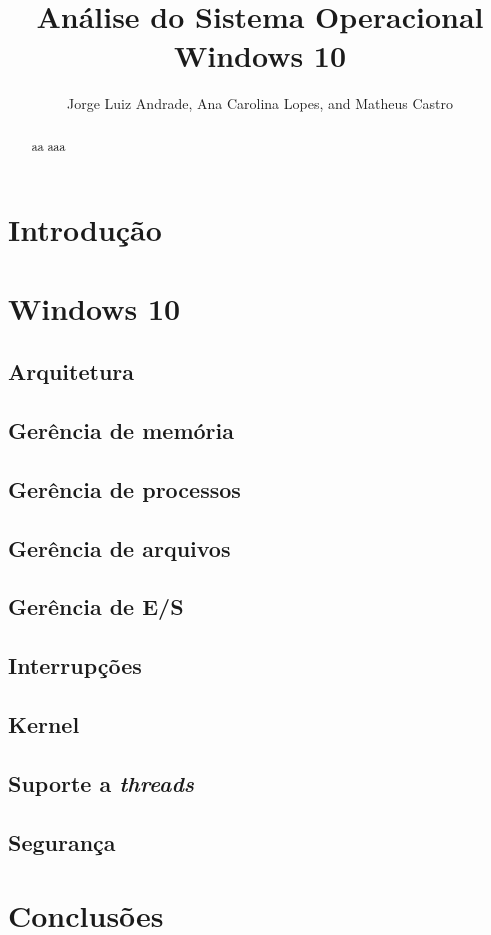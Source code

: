 \documentclass[journal]{IEEEtran}
\title{Análise do Sistema Operacional Windows 10}
\author{Jorge Luiz Andrade,
	Ana Carolina Lopes,
	and Matheus Castro}%
\begin{document}
 
	
	\maketitle
	
	\begin{abstract} 
		aa aaa\cite{internals_pt1}
	\end{abstract}
	
	\section{Introdução}
	
	
	\section{Windows 10}
	
	\subsection{Arquitetura}
	
	
	\subsection{Gerência de memória}
	
	
	\subsection{Gerência de processos}
	
	
	\subsection{Gerência de arquivos}
	 
	
	\subsection{Gerência de E/S}
	
	
	\subsection{Interrupções}
	
	
	\subsection{Kernel}
	 
	
	\subsection{Suporte a \emph{threads}}
	
	
	\subsection{Segurança}
	
	
	\section{Conclusões}
	
	
	
	
	
\end{document}
